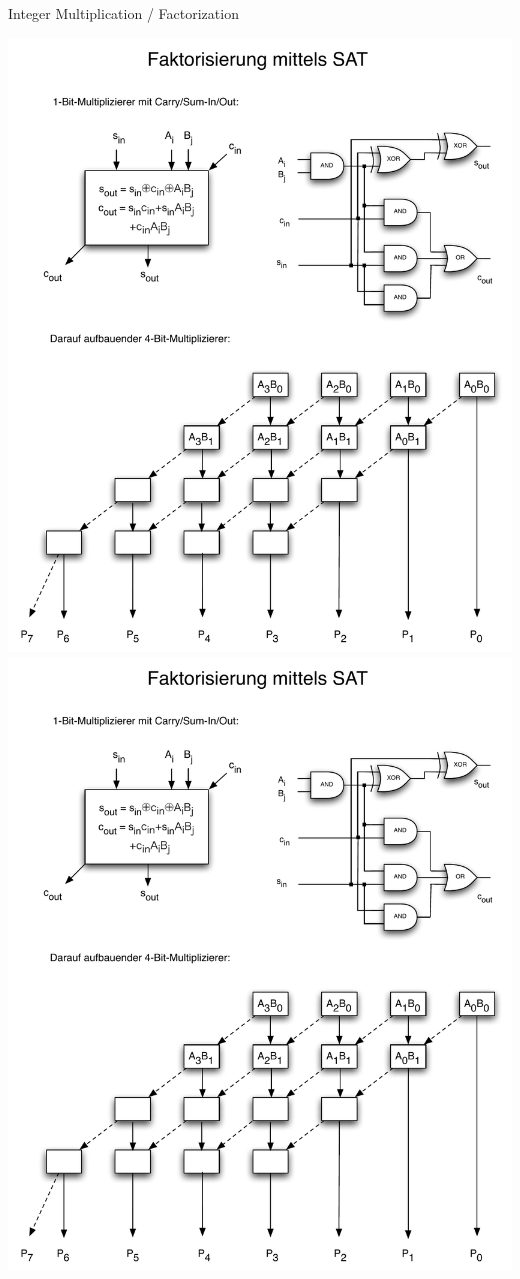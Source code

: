 \documentclass[t]{sdqbeamer}
\begin{document}
\begin{frame}{Integer Multiplication / Factorization}
	\begin{center}
		\includegraphics[height=0.4\textheight]{figures/l02/multiplier-1.pdf} \\
		\includegraphics[height=0.4\textheight]{figures/l02/multiplier-2.pdf}
	\end{center}
\end{frame}
\end{document}
